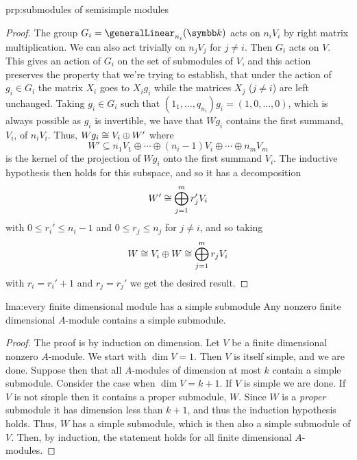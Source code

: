 \begin{prp}{}{prp:submodules of semisimple modules}
\begin{proof}
        The group \(G_i = \generalLinear_{n_i}(\field)\) acts on \(n_i V_i\) by right matrix multiplication.
        We can also act trivially on \(n_j V_j\) for \(j \ne i\).
        Then \(G_i\) acts on \(V\).
        This gives an action of \(G_i\) on the set of submodules of \(V\), and this action preserves the property that we're trying to establish, that under the action of \(g_i \in G_i\) the matrix \(X_i\) goes to \(X_i g_i\) while the matrices \(X_j\) (\(j \ne i\)) are left unchanged.
        Taking \(g_i \in G_i\) such that \((1_1, \dotsc, q_{n_i})g_i = (1, 0, \dotsc, 0)\), which is always possible as \(g_i\) is invertible, we have that \(Wg_i\) contains the first summand, \(V_i\), of \(n_i V_i\).
        Thus, \(Wg_i \cong V_i \oplus W'\) where 
        \begin{equation}
            W' \subseteq n_1 V_1 \oplus \dotsb \oplus (n_i - 1)V_i \oplus \dotsb \oplus n_m V_m
        \end{equation}
        is the kernel of the projection of \(Wg_i\) onto the first summand \(V_i\).
        The inductive hypothesis then holds for this subspace, and so it has a decomposition
        \begin{equation}
            W' \cong \bigoplus_{j=1}^m r_j' V_i
        \end{equation}
        with \(0 \le r_i' \le n_i - 1\) and \(0 \le r_j \le n_j\) for \(j \ne i\), and so taking
        \begin{equation}
            W \cong V_i \oplus W \cong \bigoplus_{j=1}^m r_jV_i
        \end{equation}
        with \(r_i = r_i' + 1\) and \(r_j = r_j'\) we get the desired result.
    \end{proof}
\end{prp}

\begin{lma}{}{lma:every finite dimensional module has a simple submodule}
    Any nonzero finite dimensional \(A\)-module contains a simple submodule.
    \begin{proof}
        The proof is by induction on dimension.
        Let \(V\) be a finite dimensional nonzero \(A\)-module.
        We start with \(\dim V = 1\).
        Then \(V\) is itself simple, and we are done.
        Suppose then that all \(A\)-modules of dimension at most \(k\) contain a simple submodule.
        Consider the case when \(\dim V = k + 1\).
        If \(V\) is simple we are done.
        If \(V\) is not simple then it contains a proper submodule, \(W\).
        Since \(W\) is a \emph{proper} submodule it has dimension less than \(k + 1\), and thus the induction hypothesis holds.
        Thus, \(W\) has a simple submodule, which is then also a simple submodule of \(V\).
        Then, by induction, the statement holds for all finite dimensional \(A\)-modules.
    \end{proof}
\end{lma}

